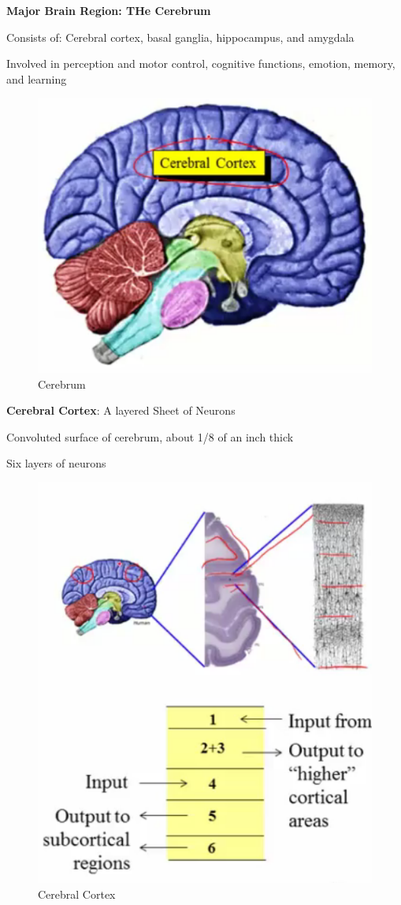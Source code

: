 \documentclass{book}
\begin{document}
 
\textbf{Major Brain Region: THe Cerebrum}

Consists of: Cerebral cortex, basal ganglia, hippocampus, and amygdala

Involved in perception and motor control, cognitive functions, emotion, memory, and learning

\begin{figure}[h]
\centering
\includegraphics[width=0.7\linewidth]{./figures/cerebrum}
\caption{Cerebrum}
\label{fig:cerebrum}
\end{figure}


\textbf{Cerebral Cortex}: A layered Sheet of Neurons

Convoluted surface of cerebrum, about 1/8 of an inch thick

Six layers of neurons

\begin{figure}[h]
\centering
\includegraphics[width=0.7\linewidth]{./figures/cerabral}
\caption{Cerebral Cortex}
\label{fig:cerabral}
\end{figure}
\end{document}
